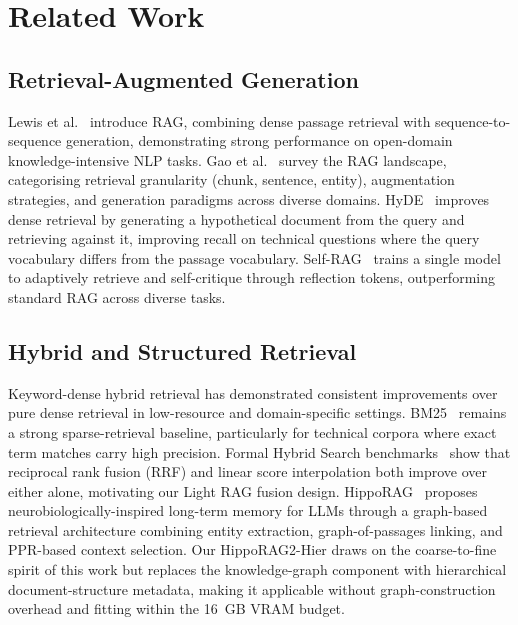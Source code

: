 \documentclass[twocolumn]{article}
\begin{document}
\section{Related Work}
\label{sec:related}

\subsection{Retrieval-Augmented Generation}

Lewis et al.~\cite{lewis2020rag} introduce RAG, combining dense passage retrieval
with sequence-to-sequence generation, demonstrating strong performance on
open-domain knowledge-intensive NLP tasks.
Gao et al.~\cite{gao2024ragsurvey} survey the RAG landscape, categorising
retrieval granularity (chunk, sentence, entity), augmentation strategies,
and generation paradigms across diverse domains.
HyDE~\cite{gao2023hyde} improves dense retrieval by generating a hypothetical
document from the query and retrieving against it, improving recall on
technical questions where the query vocabulary differs from the passage vocabulary.
Self-RAG~\cite{asai2024selfrag} trains a single model to adaptively retrieve
and self-critique through reflection tokens, outperforming standard RAG across
diverse tasks.

\subsection{Hybrid and Structured Retrieval}

Keyword-dense hybrid retrieval has demonstrated consistent improvements over
pure dense retrieval in low-resource and domain-specific settings.
BM25~\cite{robertson2009bm25} remains a strong sparse-retrieval baseline,
particularly for technical corpora where exact term matches carry high precision.
Formal Hybrid Search benchmarks~\cite{ma2021replication} show that
reciprocal rank fusion (RRF) and linear score interpolation both improve over
either alone, motivating our Light RAG fusion design.
HippoRAG~\cite{gutiontov2024hipporag2} proposes neurobiologically-inspired
long-term memory for LLMs through a graph-based retrieval architecture combining
entity extraction, graph-of-passages linking, and PPR-based context selection.
Our HippoRAG2-Hier draws on the coarse-to-fine spirit of this work but replaces
the knowledge-graph component with hierarchical document-structure metadata,
making it applicable without graph-construction overhead and fitting within
the 16~GB VRAM budget.
\end{document}
